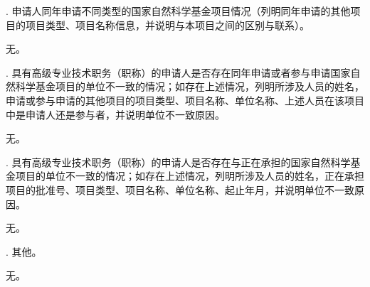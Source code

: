 \documentclass[12pt,UTF8,AutoFakeBold=3,a4paper]{ctexart} %
\newcommand{\sihao}{\fontsize{14.2pt}{\baselineskip}\selectfont}
\begin{document}
{\sihao \color{MsBlue} . 申请人同年申请不同类型的国家自然科学基金项目情况（列明同年申请的其他项目的项目类型、项目名称信息，并说明与本项目之间的区别与联系）。}

无。

{\sihao \color{MsBlue} . 具有高级专业技术职务（职称）的申请人是否存在同年申请或者参与申请国家自然科学基金项目的单位不一致的情况；如存在上述情况，列明所涉及人员的姓名，申请或参与申请的其他项目的项目类型、项目名称、单位名称、上述人员在该项目中是申请人还是参与者，并说明单位不一致原因。}

无。

{\sihao \color{MsBlue} . 具有高级专业技术职务（职称）的申请人是否存在与正在承担的国家自然科学基金项目的单位不一致的情况；如存在上述情况，列明所涉及人员的姓名，正在承担项目的批准号、项目类型、项目名称、单位名称、起止年月，并说明单位不一致原因。}

无。

{\sihao \color{MsBlue} . 其他。}

无。
\end{document}
